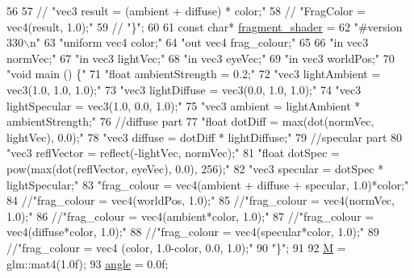 \begin{DoxyCode}
56 
57     \textcolor{comment}{//      "vec3 result = (ambient + diffuse) * color;"}
58     \textcolor{comment}{//      "FragColor = vec4(result, 1.0);"}
59     \textcolor{comment}{//  "\}";}
60 
61     \textcolor{keyword}{const} \textcolor{keywordtype}{char}* \mbox{\hyperlink{ZPGEngine_8cpp_ab187f2ba2a2f72ea5571921a1a856582}{fragment\_shader}} =
62         \textcolor{stringliteral}{"#version 330\(\backslash\)n"}
63         \textcolor{stringliteral}{"uniform vec4 color;"}
64         \textcolor{stringliteral}{"out vec4 frag\_colour;"}
65 
66         \textcolor{stringliteral}{"in vec3 normVec;"}
67         \textcolor{stringliteral}{"in vec3 lightVec;"}
68         \textcolor{stringliteral}{"in vec3 eyeVec;"}
69         \textcolor{stringliteral}{"in vec3 worldPos;"}
70         \textcolor{stringliteral}{"void main () \{"}
71             \textcolor{stringliteral}{"float ambientStrength = 0.2;"}
72             \textcolor{stringliteral}{"vec3 lightAmbient = vec3(1.0, 1.0, 1.0);"}
73             \textcolor{stringliteral}{"vec3 lightDiffuse = vec3(0.0, 1.0, 1.0);"}
74             \textcolor{stringliteral}{"vec3 lightSpecular = vec3(1.0, 0.0, 1.0);"}
75             \textcolor{stringliteral}{"vec3 ambient = lightAmbient * ambientStrength;"}
76             \textcolor{comment}{//diffuse part}
77             \textcolor{stringliteral}{"float dotDiff = max(dot(normVec, lightVec), 0.0);"}
78             \textcolor{stringliteral}{"vec3 diffuse = dotDiff * lightDiffuse;"}
79             \textcolor{comment}{//specular part}
80             \textcolor{stringliteral}{"vec3 reflVector = reflect(-lightVec, normVec);"}
81             \textcolor{stringliteral}{"float dotSpec = pow(max(dot(reflVector, eyeVec), 0.0), 256);"}
82             \textcolor{stringliteral}{"vec3 specular = dotSpec * lightSpecular;"}
83             \textcolor{stringliteral}{"frag\_colour = vec4(ambient + diffuse + specular, 1.0)*color;"}
84             \textcolor{comment}{//"frag\_colour = vec4(worldPos, 1.0);"}
85             \textcolor{comment}{//"frag\_colour = vec4(normVec, 1.0);"}
86             \textcolor{comment}{//"frag\_colour = vec4(ambient*color, 1.0);"}
87             \textcolor{comment}{//"frag\_colour = vec4(diffuse*color, 1.0);"}
88             \textcolor{comment}{//"frag\_colour = vec4(specular*color, 1.0);"}
89             \textcolor{comment}{//"frag\_colour = vec4 (color, 1.0-color, 0.0, 1.0);"}
90         \textcolor{stringliteral}{"\}"};
91 
92     \mbox{\hyperlink{classApplication_1_1Engines_1_1LightEngine_ae9cca787b2b0d5d4dbcc3c63afa196e1}{M}} = glm::mat4(1.0f);
93     \mbox{\hyperlink{classApplication_1_1Engines_1_1LightEngine_ad729a37b02875c824d6bd2c8630a4520}{angle}} = 0.0f;

\end{DoxyCode}
